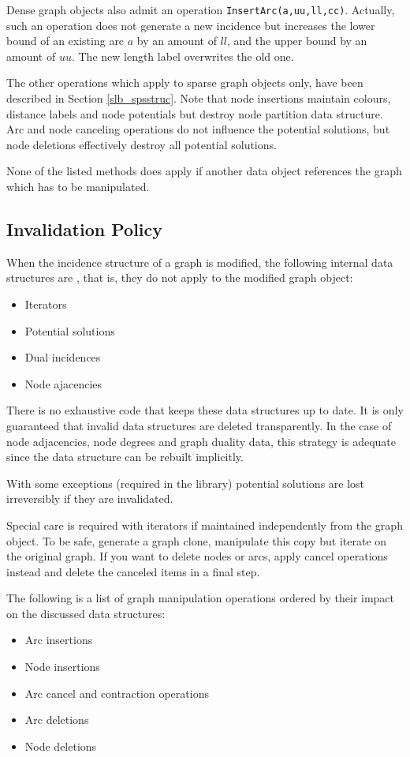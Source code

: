 \documentclass[a4paper,11pt,twoside]{book}
\begin{document}
\begin{multicols}{2}
Dense graph objects also admit an operation
\verb/InsertArc(a,uu,ll,cc)/. Actually, such an operation
does not generate a new incidence but increases the lower bound
of an existing arc $a$ by an amount of $ll$, and the upper bound
by an amount of $uu$. The new length label overwrites the old one.

The other operations which apply to sparse graph objects only, have been
described in Section \ref{slb_spsstruc}. Note that node insertions maintain
colours, distance labels and node potentials but destroy node partition data
structure. Arc and node canceling operations do not influence the potential
solutions, but node deletions effectively destroy all potential solutions.

None of the listed methods does apply if another data object references the
graph which has to be manipulated.


\subsection{Invalidation Policy}
When the incidence structure of a graph is modified, the following internal
data structures are , that is, they do not apply to the
modified graph object:
\begin{itemize}
\item Iterators
\item Potential solutions
\item Dual incidences
\item Node ajacencies
\end{itemize}
There is no exhaustive code that keeps these data structures up to date. It is
only guaranteed that invalid data structures are deleted transparently. In the
case of node adjacencies, node degrees and graph duality data, this strategy
is adequate since the data structure can be rebuilt implicitly.

With some exceptions (required in the library) potential solutions are lost
irreversibly if they are invalidated.

Special care is required with iterators if maintained independently from the
graph object. To be safe, generate a graph clone, manipulate this copy but
iterate on the original graph. If you want to delete nodes or arcs, apply
cancel operations instead and delete the canceled items in a final step.

The following is a list of graph manipulation operations ordered by their
impact on the discussed data structures:
\begin{itemize}
\item Arc insertions
\item Node insertions
\item Arc cancel and contraction operations
\item Arc deletions
\item Node deletions
\end{itemize}



\end{multicols}
\end{document}
